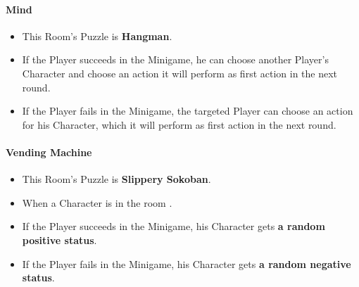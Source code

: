 \paragraph{Mind}
\begin{itemize}
	\item This Room's Puzzle is \textbf{Hangman}.
	\item If the Player succeeds in the Minigame, he can choose another Player's Character and choose an action it will perform as first action in the next round.
	\item If the Player fails    in the Minigame, the targeted Player can choose an action for his Character, which it will perform as first action in the next round.
\end{itemize}

\paragraph{Vending Machine} 
\begin{itemize}
	\item This Room's Puzzle is \textbf{Slippery Sokoban}.
	\item When a Character is in the room .
	\item If the Player succeeds in the Minigame, his Character gets \textbf{a random positive status}.
	\item If the Player fails    in the Minigame, his Character gets \textbf{a random negative status}.
\end{itemize}


